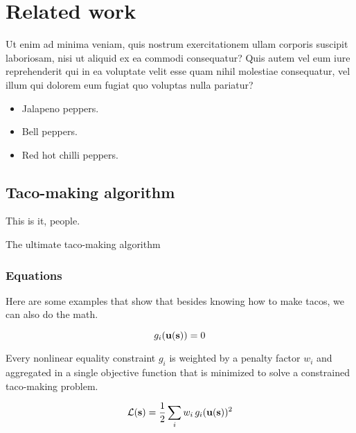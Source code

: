 
\section{Related work}
\label{relatedwork}

Ut enim ad minima veniam, quis nostrum exercitationem ullam corporis suscipit laboriosam, nisi ut aliquid ex ea commodi consequatur? Quis autem vel eum iure reprehenderit qui in ea voluptate velit esse quam nihil molestiae consequatur, vel illum qui dolorem eum fugiat quo voluptas nulla pariatur?

\begin{itemize}
    \itemsep 0em
    \item Jalapeno peppers.
    \item Bell peppers.
    \item Red hot chilli peppers.
\end{itemize}

\subsection{Taco-making algorithm}
\label{tacomaking}

This is it, people.

\begin{algorithm}[!ht]
    \caption{The ultimate taco-making algorithm}
    \label{taco_algo}
    
\end{algorithm}

\subsubsection{Equations}
\label{equations}

Here are some examples that show that besides knowing how to make tacos, we can also do the math.

\begin{equation}
\label{eq:constraint}
    g_i(\mathbf{u}(\mathbf{s})) = 0
\end{equation}

Every nonlinear equality constraint $g_i$ is weighted by a penalty factor $w_i$ and aggregated in a single objective function that is minimized to solve a constrained taco-making problem.

\begin{equation}
\label{eq:opt_problem}
    \mathcal{L}(\mathbf{s})
    =
    \frac{1}{2} \sum_i w_i \, g_i( \mathbf{u}(\mathbf{s}))^2
\end{equation}